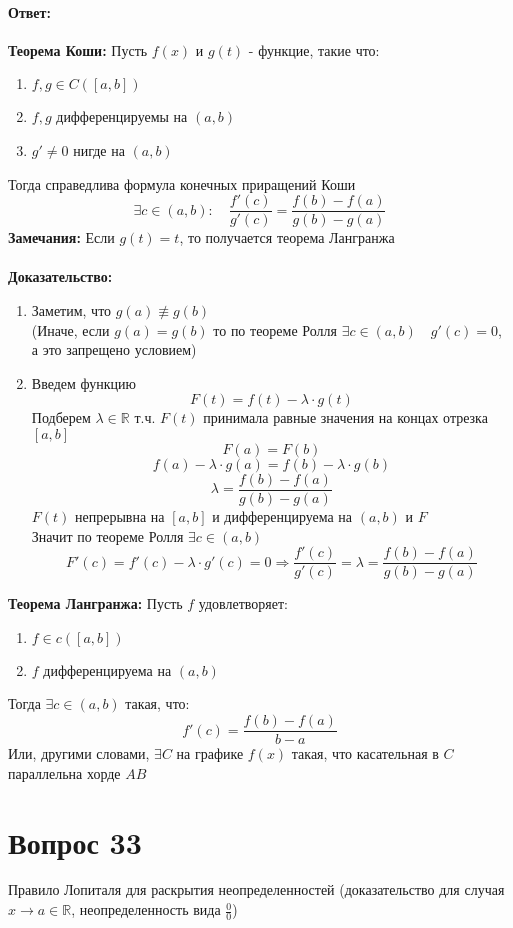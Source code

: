\documentclass{article}
\DeclareMathOperator{\Exists}{\exists}
\begin{document}
\subsection*{Ответ:}
\textbf{Теорема Коши:}
Пусть $f(x)$ и $g(t)$ - функцие, такие что:
\begin{enumerate}
   \item $f, g \in C([a,b])$
   \item $f, g$ дифференцируемы на $(a, b)$
   \item $g'\ne 0$ нигде на $(a,b)$
\end{enumerate}
Тогда справедлива формула конечных приращений Коши
$$
\Exists c \in (a,b):\quad \frac{f'(c)}{g'(c)}=\frac{f(b)-f(a)}{g(b)-g(a)}
$$
\textbf{Замечания:}
Если $g(t) = t$, то получается теорема Лангранжа\\\\
\textbf{Доказательство:}
\begin{enumerate}
   \item Заметим, что $g(a)\not\equiv g(b)$\\
(Иначе, если $g(a)=g(b)$ то по теореме Ролля $\Exists c\in (a,b)\quad g'(c)=0$, а это запрещено условием)
\item Введем функцию
$$
F(t) = f(t)-\lambda \cdot g(t)
$$
Подберем $\lambda \in\mathbb{R}$ т.ч. $F(t)$ принимала равные значения на концах отрезка $[a,b]$
$$F(a)=F(b)$$
$$f(a)-\lambda\cdot g(a)=f(b)-\lambda\cdot g(b)$$
$$\lambda=\frac{f(b)-f(a)}{g(b)-g(a)}$$
$F(t)$ непрерывна на $[a, b]$ и дифференцируема на $(a,b)$ и $F$\\
Значит по теореме Ролля $\Exists c \in (a,b)$
$$F'(c)=f'(c)-\lambda\cdot g'(c)=0 \Rightarrow \frac{f'(c)}{g'(c)}=\lambda=\frac{f(b)-f(a)}{g(b)-g(a)}$$
\end{enumerate}
\textbf{Теорема Лангранжа:}
Пусть $f$ удовлетворяет:
\begin{enumerate}
   \item $f\in c([a,b])$
   \item $f$ дифференцируема на $(a,b)$
\end{enumerate}
Тогда $\Exists c\in (a,b)$ такая, что:
$$f'(c)=\frac{f(b)-f(a)}{b-a}$$
Или, другими словами, $\Exists C$ на графике $f(x)$ такая, что касательная в $C$ параллельна хорде $AB$  
 
\part*{Вопрос 33}
\begin{center}
Правило Лопиталя для раскрытия неопределенностей (доказательство для случая $x\rightarrow a \in \mathbb{R}$, неопределенность вида $\frac{0}{0}$)
\end{center}
\end{document}

